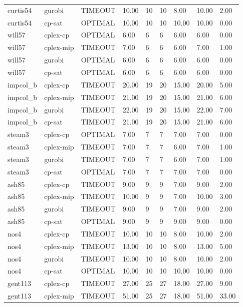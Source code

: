 \begin{tabular}{lllllllll}
curtis54 & gurobi & TIMEOUT & 10.00 & 10 & 10 & 8.00 & 10.00 & 2.00 \\
curtis54 & cp-sat & OPTIMAL & 10.00 & 10 & 10 & 10.00 & 10.00 & 0.00 \\
will57 & cplex-cp & OPTIMAL & 6.00 & 6 & 6 & 6.00 & 6.00 & 0.00 \\
will57 & cplex-mip & TIMEOUT & 7.00 & 6 & 6 & 6.00 & 7.00 & 1.00 \\
will57 & gurobi & OPTIMAL & 6.00 & 6 & 6 & 6.00 & 6.00 & 0.00 \\
will57 & cp-sat & OPTIMAL & 6.00 & 6 & 6 & 6.00 & 6.00 & 0.00 \\
impcol\_b & cplex-cp & TIMEOUT & 20.00 & 19 & 20 & 15.00 & 20.00 & 5.00 \\
impcol\_b & cplex-mip & TIMEOUT & 21.00 & 19 & 20 & 15.00 & 21.00 & 6.00 \\
impcol\_b & gurobi & TIMEOUT & 22.00 & 19 & 20 & 15.00 & 22.00 & 7.00 \\
impcol\_b & cp-sat & TIMEOUT & 21.00 & 19 & 20 & 15.00 & 21.00 & 6.00 \\
steam3 & cplex-cp & OPTIMAL & 7.00 & 7 & 7 & 7.00 & 7.00 & 0.00 \\
steam3 & cplex-mip & TIMEOUT & 7.00 & 7 & 7 & 6.00 & 7.00 & 1.00 \\
steam3 & gurobi & TIMEOUT & 7.00 & 7 & 7 & 6.00 & 7.00 & 1.00 \\
steam3 & cp-sat & OPTIMAL & 7.00 & 7 & 7 & 7.00 & 7.00 & 0.00 \\
ash85 & cplex-cp & TIMEOUT & 9.00 & 9 & 9 & 7.00 & 9.00 & 2.00 \\
ash85 & cplex-mip & TIMEOUT & 10.00 & 9 & 9 & 7.00 & 10.00 & 3.00 \\
ash85 & gurobi & TIMEOUT & 9.00 & 9 & 9 & 7.00 & 9.00 & 2.00 \\
ash85 & cp-sat & OPTIMAL & 9.00 & 9 & 9 & 9.00 & 9.00 & 0.00 \\
nos4 & cplex-cp & TIMEOUT & 10.00 & 10 & 10 & 8.00 & 10.00 & 2.00 \\
nos4 & cplex-mip & TIMEOUT & 13.00 & 10 & 10 & 8.00 & 13.00 & 5.00 \\
nos4 & gurobi & TIMEOUT & 10.00 & 10 & 10 & 8.00 & 10.00 & 2.00 \\
nos4 & cp-sat & OPTIMAL & 10.00 & 10 & 10 & 10.00 & 10.00 & 0.00 \\
gent113 & cplex-cp & TIMEOUT & 27.00 & 25 & 27 & 18.00 & 27.00 & 9.00 \\
gent113 & cplex-mip & TIMEOUT & 51.00 & 25 & 27 & 18.00 & 51.00 & 33.00 \\

\end{tabular}

